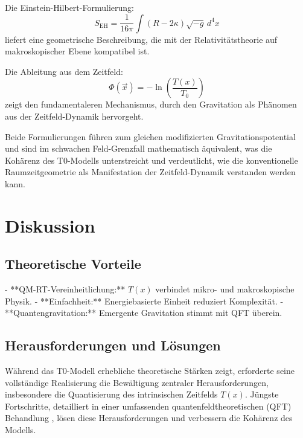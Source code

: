 \documentclass[12pt,a4paper]{article}
\newcommand{\Tfield}{T(x)}
\newcommand{\Tzero}{T_0}
\newcommand{\vecx}{\vec{x}}
\begin{document}
Die Einstein-Hilbert-Formulierung:
\begin{equation}
	S_{\text{EH}} = \frac{1}{16\pi} \int (R - 2\kappa) \sqrt{-g} \, d^4x
\end{equation}
liefert eine geometrische Beschreibung, die mit der Relativitätstheorie auf makroskopischer Ebene kompatibel ist.

Die Ableitung aus dem Zeitfeld:
\begin{equation}
	\Phi(\vecx) = -\ln\left(\frac{\Tfield}{\Tzero}\right)
\end{equation}
zeigt den fundamentaleren Mechanismus, durch den Gravitation als Phänomen aus der Zeitfeld-Dynamik hervorgeht.

Beide Formulierungen führen zum gleichen modifizierten Gravitationspotential und sind im schwachen Feld-Grenzfall mathematisch äquivalent, was die Kohärenz des T0-Modells unterstreicht und verdeutlicht, wie die konventionelle Raumzeitgeometrie als Manifestation der Zeitfeld-Dynamik verstanden werden kann.
	
	\section{Diskussion}
	\label{sec:discussion}
	
	\subsection{Theoretische Vorteile}
	- **QM-RT-Vereinheitlichung:** \(\Tfield\) verbindet mikro- und makroskopische Physik.
	- **Einfachheit:** Energiebasierte Einheit reduziert Komplexität.
	- **Quantengravitation:** Emergente Gravitation stimmt mit QFT überein.
	
	\subsection{Herausforderungen und Lösungen}
	\label{subsec:challenges}
	
	Während das T0-Modell erhebliche theoretische Stärken zeigt, erforderte seine vollständige Realisierung die Bewältigung zentraler Herausforderungen, insbesondere die Quantisierung des intrinsischen Zeitfelds \(\Tfield\). Jüngste Fortschritte, detailliert in einer umfassenden quantenfeldtheoretischen (QFT) Behandlung \cite{pascher_qft_2025}, lösen diese Herausforderungen und verbessern die Kohärenz des Modells.
	
\end{document}
